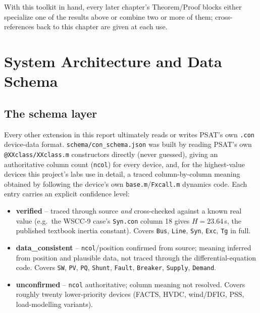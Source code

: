 \documentclass[11pt]{report}
\newcommand{\pkg}[1]{\texttt{#1}}
\theoremstyle{plain}
\theoremstyle{definition}
\theoremstyle{remark}
\begin{document}
With this toolkit in hand, every later chapter's Theorem/Proof blocks
either specialize one of the results above or combine two or more of
them; cross-references back to this chapter are given at each use.

\chapter{System Architecture and Data Schema}
\label{ch:architecture}

\section{The schema layer}

Every other extension in this report ultimately reads or writes PSAT's
own \texttt{.con} device-data format. \pkg{schema/con\_\hspace{0pt}schema.json} was
built by reading PSAT's own \pkg{@XXclass/XXclass\hspace{0pt}.m} constructors
directly (never guessed), giving an authoritative column count
(\texttt{ncol}) for every device, and, for the highest-value devices this
project's labs use in detail, a traced column-by-column meaning obtained
by following the device's own \texttt{base.m}/\texttt{Fxcall.m} dynamics
code. Each entry carries an explicit confidence level:

\begin{itemize}
\item \textbf{verified} -- traced through source \emph{and}
  cross-checked against a known real value (e.g.\ the WSCC-9 case's
  \texttt{Syn.con} column 18 gives $H=23.64$\,s, the published textbook
  inertia constant). Covers \texttt{Bus}, \texttt{Line}, \texttt{Syn},
  \texttt{Exc}, \texttt{Tg} in full.
\item \textbf{data\_consistent} -- \texttt{ncol}/position confirmed from
  source; meaning inferred from position and plausible data, not traced
  through the differential-equation code. Covers \texttt{SW}, \texttt{PV},
  \texttt{PQ}, \texttt{Shunt}, \texttt{Fault}, \texttt{Breaker},
  \texttt{Supply}, \texttt{Demand}.
\item \textbf{unconfirmed} -- \texttt{ncol} authoritative; column meaning
  not resolved. Covers roughly twenty lower-priority devices (FACTS,
  HVDC, wind/DFIG, PSS, load-modelling variants).
\end{itemize}
\end{document}
